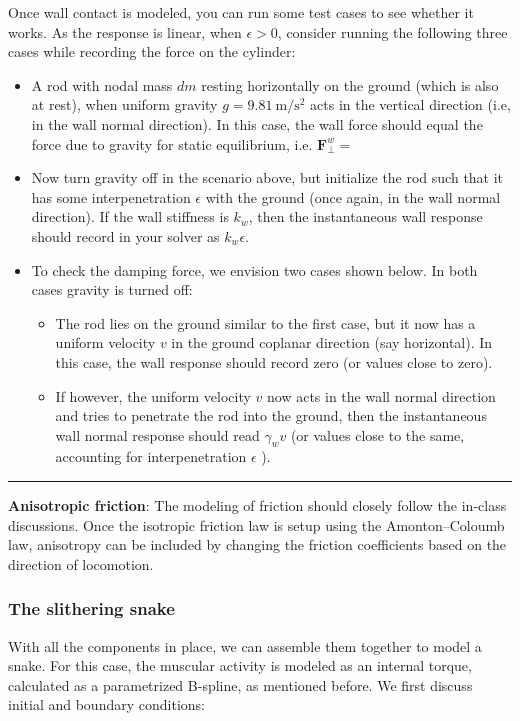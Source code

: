\documentclass[11pt]{article}
\begin{document}
Once wall contact is modeled, you can run some test cases to see
whether it works. As the response is linear, when \(\epsilon > 0\),
consider running the following three cases while recording the force on the
cylinder:
\begin{itemize}
\item A rod with nodal mass \(dm\) resting horizontally on the ground (which
is also at rest), when
uniform gravity \(g = \SI{9.81}{\m\per\s^2}\) acts in the vertical
direction (i.e, in the wall normal direction). In
this case, the wall force should equal the force due to gravity for static
equilibrium, i.e. \(\mathbf{F}^w_{\perp}=\)
\item Now turn gravity off in the scenario above, but initialize the rod such
that it has some interpenetration \(\epsilon\) with the ground (once
again, in the wall normal direction). If the
wall stiffness is \(k_w\), then the instantaneous wall response should
record in your solver as \(k_w \epsilon\).
\item To check the damping force, we envision two cases shown below. In both
cases gravity is turned off:
\begin{itemize}
\item The rod lies on the ground similar to the first case, but it now has a
uniform velocity \(v\) in the ground coplanar direction (say
horizontal). In this case, the wall response should record zero (or
values close to zero).
\item If however, the uniform velocity \(v\) now acts in the wall normal
direction and tries to penetrate the rod into the ground, then the
instantaneous wall normal response should read \(\gamma_w v\) (or
values close to the same, accounting for interpenetration \(\epsilon\) ).
\end{itemize}
\end{itemize}

\noindent\rule{1\textwidth}{0.01pt}
\textbf{Anisotropic friction}: The modeling of friction should closely follow
the in-class discussions. Once the isotropic friction law is setup using
the Amonton--Coloumb law, anisotropy can be included by changing the
friction coefficients based on the direction of locomotion.

\subsubsection{The slithering snake}
\label{sec:orgdcb26d1}
With all the components in place, we can assemble them together to model a
snake. For this case, the muscular activity
is modeled as an internal torque, calculated as a parametrized B-spline, as mentioned
before. We first discuss initial and boundary conditions:
\end{document}
